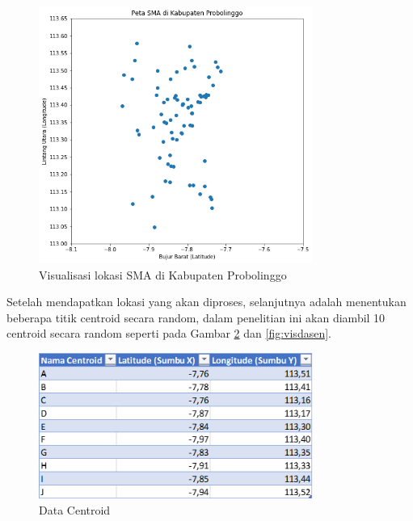 \begin{figure}[h!]
  \centering
  \includegraphics[width=0.8\textwidth]{peta sma.png}
  \caption{Visualisasi lokasi SMA di Kabupaten Probolinggo}
  \label{fig:petasma}
\end{figure}

Setelah mendapatkan lokasi yang akan diproses, selanjutnya adalah menentukan beberapa titik centroid secara random, dalam penelitian ini akan diambil 10 centroid secara random seperti pada Gambar \ref{fig:dasen} dan \ref{fig:visdasen}.

\begin{figure}[h!]
	\centering
	\includegraphics[width=0.8\textwidth]{centroid.png}
	\caption{Data Centroid}
	\label{fig:dasen}
\end{figure}

